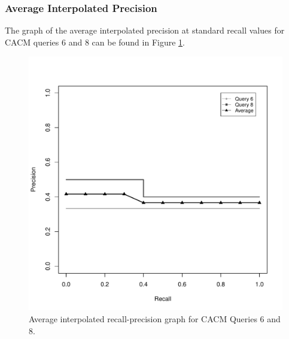 \subsubsection{Average Interpolated Precision}
The graph of the average interpolated precision at standard recall values for CACM queries 6 and 8 can be found in Figure \ref{fig:aiprgraph68}.

\begin{figure}[H]
\centering
\label{fig:aiprgraph68}
\includegraphics[scale=.6]{code/getrel/aipr68.pdf}
\caption{Average interpolated recall-precision graph for CACM Queries 6 and 8.}
\end{figure}




